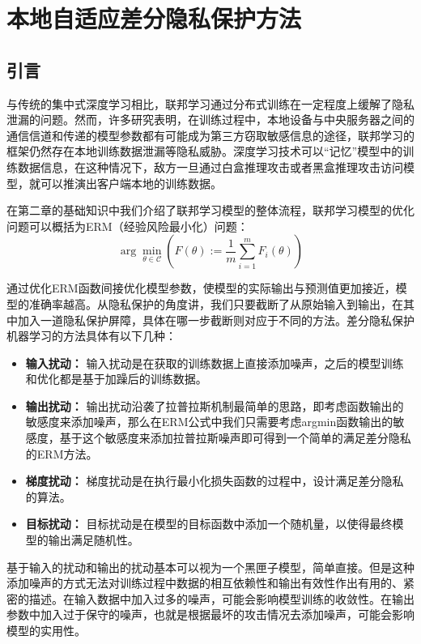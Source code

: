\chapter{本地自适应差分隐私保护方法}

\label{ch3}

\section{引言}
与传统的集中式深度学习相比，联邦学习通过分布式训练在一定程度上缓解了隐私泄漏的问题。然而，许多研究表明，在训练过程中，本地设备与中央服务器之间的通信信道和传递的模型参数都有可能成为第三方窃取敏感信息的途径，联邦学习的框架仍然存在本地训练数据泄漏等隐私威胁。深度学习技术可以“记忆”模型中的训练数据信息，在这种情况下，敌方一旦通过白盒推理攻击或者黑盒推理攻击访问模型，就可以推演出客户端本地的训练数据。

在第二章的基础知识中我们介绍了联邦学习模型的整体流程，联邦学习模型的优化问题可以概括为ERM（经验风险最小化）问题：
\begin{equation}\label{eq:ERM}
\arg \min _{\theta \in \mathcal{C}}\left(F(\theta):=\frac{1}{m} \sum_{i=1}^{m} F_{i}(\theta)\right)
\end{equation}

通过优化ERM函数间接优化模型参数，使模型的实际输出与预测值更加接近，模型的准确率越高。从隐私保护的角度讲，我们只要截断了从原始输入到输出，在其中加入一道隐私保护屏障，具体在哪一步截断则对应于不同的方法。差分隐私保护机器学习的方法具体有以下几种：
\begin{itemize}
	\item \textbf{输入扰动：} 输入扰动是在获取的训练数据上直接添加噪声，之后的模型训练和优化都是基于加躁后的训练数据。
	\item \textbf{输出扰动：} 输出扰动沿袭了拉普拉斯机制最简单的思路，即考虑函数输出的敏感度来添加噪声，那么在ERM公式中我们只需要考虑argmin函数输出的敏感度，基于这个敏感度来添加拉普拉斯噪声即可得到一个简单的满足差分隐私的ERM方法。
	\item \textbf{梯度扰动：} 梯度扰动是在执行最小化损失函数的过程中，设计满足差分隐私的算法。
	\item \textbf{目标扰动：} 目标扰动是在模型的目标函数中添加一个随机量，以使得最终模型的输出满足随机性。
\end{itemize}

基于输入的扰动和输出的扰动基本可以视为一个黑匣子模型，简单直接。但是这种添加噪声的方式无法对训练过程中数据的相互依赖性和输出有效性作出有用的、紧密的描述。在输入数据中加入过多的噪声，可能会影响模型训练的收敛性。在输出参数中加入过于保守的噪声，也就是根据最坏的攻击情况去添加噪声，可能会影响模型的实用性。

